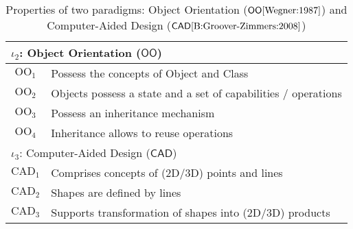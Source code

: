 \begin{table}[t]
   \begin{center}
      \begin{tabular}[t]{c l}
         \hline
         \multicolumn{2}{l}{$\iota_2$: Object Orientation ($\mathsf{OO}$)}\\
         \hline
         $\mbox{OO}_1$ & Possess the concepts of Object and Class\\
         $\mbox{OO}_2$ & Objects possess a state and a set of capabilities / 
operations \\
         $\mbox{OO}_3$ & Possess an inheritance mechanism\\
         $\mbox{OO}_4$ & Inheritance allows to reuse operations\\
         \hline\hline
         \multicolumn{2}{l}{$\iota_3$: Computer-Aided Design ($\mathsf{CAD}$)}\\
         \hline
         $\mbox{CAD}_1$ & Comprises concepts of (2D/3D) points and lines\\
         $\mbox{CAD}_2$ & Shapes are defined by lines\\
         $\mbox{CAD}_3$ & Supports transformation of shapes into (2D/3D) 
products\\
         \hline
      \end{tabular}
   \end{center}
   \label{tab:Properties}
   \caption{Properties of two paradigms: Object Orientation ($\mathsf{OO} 
\cite{Wegner:1987}$) and Computer-Aided Design ($\mathsf{CAD} 
\cite{B:Groover-Zimmers:2008}$)}
\end{table}
